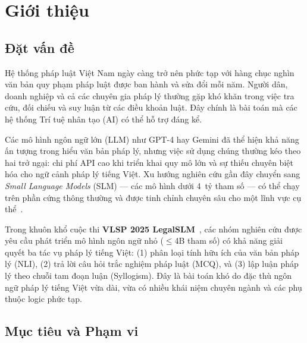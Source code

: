 \documentclass[fontsize=13pt,a4paper,oneside,DIV=calc,chapterprefix=true]{scrbook}
\begin{document}
\mainmatter

\fancyhead{}
\renewcommand{\footrulewidth}{0.4pt}
\pagestyle{fancy}
\fancyhead[RO]{\small\thepage}
\fancyfoot[C]{}

\chapter*{Giới thiệu}
\label{chap:intro}

\section*{Đặt vấn đề}

Hệ thống pháp luật Việt Nam ngày càng trở nên phức tạp với hàng chục nghìn văn bản quy phạm
pháp luật được ban hành và sửa đổi mỗi năm. Người dân, doanh nghiệp và cả các chuyên gia pháp
lý thường gặp khó khăn trong việc tra cứu, đối chiếu và suy luận từ các điều khoản luật.
Đây chính là bài toán mà các hệ thống Trí tuệ nhân tạo (AI) có thể hỗ trợ đáng kể.

Các mô hình ngôn ngữ lớn (LLM) như GPT-4 hay Gemini đã thể hiện khả năng ấn tượng trong hiểu
văn bản pháp lý, nhưng việc sử dụng chúng thường kéo theo hai trở ngại: chi phí API cao khi
triển khai quy mô lớn và sự thiếu chuyên biệt hóa cho ngữ cảnh pháp lý tiếng Việt. Xu hướng
nghiên cứu gần đây chuyển sang \textit{Small Language Models} (SLM) --- các mô hình dưới
4~tỷ tham số --- có thể chạy trên phần cứng thông thường và được tinh chỉnh chuyên sâu cho
một lĩnh vực cụ thể~\cite{bosch2025, minlegal2025}.

Trong khuôn khổ cuộc thi \textbf{VLSP 2025 LegalSLM}~\cite{vlsp2025}, các nhóm nghiên cứu
được yêu cầu phát triển mô hình ngôn ngữ nhỏ ($\leq$4B tham số) có khả năng giải quyết ba
tác vụ pháp lý tiếng Việt: (1) phân loại tính hữu ích của văn bản pháp lý (NLI), (2) trả lời
câu hỏi trắc nghiệm pháp luật (MCQ), và (3) lập luận pháp lý theo chuỗi tam đoạn luận
(Syllogism). Đây là bài toán khó do đặc thù ngôn ngữ pháp lý tiếng Việt vừa dài, vừa có
nhiều khái niệm chuyên ngành và các phụ thuộc logic phức tạp.

\section*{Mục tiêu và Phạm vi}
\end{document}
